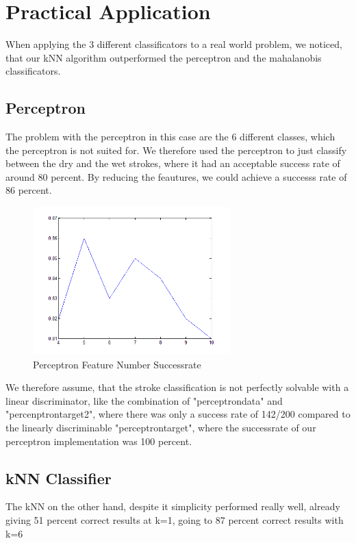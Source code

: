 \documentclass{article}
\begin{document}
\section{Practical Application}

When applying the 3 different classificators to a real world problem, we noticed, that our kNN algorithm outperformed the perceptron and the mahalanobis classificators. 

\subsection{Perceptron}

The problem with the perceptron in this case are the 6 different classes, which the perceptron is not suited for. We therefore used the perceptron to just classify between the dry and the wet strokes, where it had an acceptable success rate of around 80 percent. By reducing the feautures, we could achieve a successs rate of 86 percent.

\begin{figure}
    \centering
    \includegraphics[width=3.0in]{perceptron_feature_number_successrate}
    \caption{Perceptron Feature Number Successrate}
    \label{perceptron}
\end{figure}

We therefore assume, that the stroke classification is not perfectly solvable with a linear discriminator, like the combination of "perceptrondata" and "percenptrontarget2", where there was only a success rate of 142/200 compared to the linearly discriminable "perceptrontarget", where the successrate of our perceptron implementation was 100 percent.

\subsection{kNN Classifier}

The kNN on the other hand, despite it simplicity performed really well, already giving 51 percent correct results at k=1, going to 87 percent correct results with k=6
\end{document}
